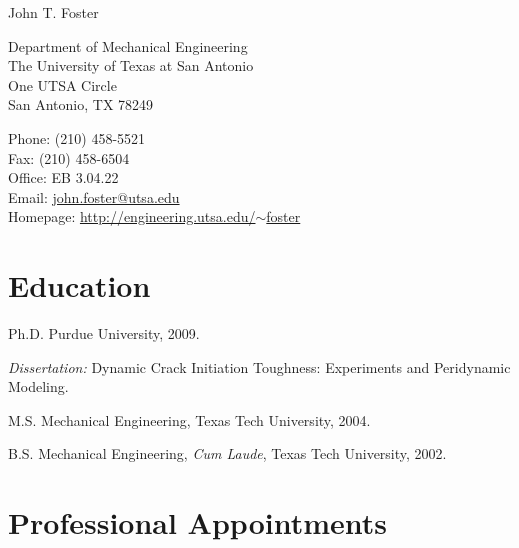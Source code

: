 \documentclass[12 pt,letterpaper]{article}
\makeatletter
\let\saved@bibitem\@bibitem %
\def\name{John T. Foster}
\renewenvironment{itemize}{
  \begin{list}{}{
    \setlength{\leftmargin}{1.5em}
    \setlength{\itemsep}{0.25em}
    \setlength{\parskip}{0pt}
    \setlength{\parsep}{0.25em}
  }
}{
  \end{list}
}
\makeatother
\begin{document}
\begingroup
\makeatletter
\let\@bibitem\saved@bibitem %
\endgroup


{\huge \name}


\bigskip

\begin{minipage}[t]{0.5\textwidth}
  Department of Mechanical Engineering \\
  The University of Texas at San Antonio \\
  One UTSA Circle \\
  San Antonio, TX 78249
\end{minipage}
\begin{minipage}[t]{0.5\textwidth}
  Phone: (210) 458-5521 \\
  Fax: (210) 458-6504 \\
  Office: EB 3.04.22 \\
  Email: \href{mailto:john.foster@utsa.edu}{john.foster@utsa.edu} \\
  Homepage: \href{http://engineering.utsa.edu/~foster}{http://engineering.utsa.edu/$\sim$foster}
\end{minipage}

\section*{Education}

\begin{itemize}
  \item Ph.D. Purdue University, 2009.
    \begin{itemize}
    \item \textit{Dissertation:}
      Dynamic Crack Initiation Toughness: Experiments and Peridynamic Modeling.
    \end{itemize}
  \item M.S. Mechanical Engineering, Texas Tech University, 2004.
  \item B.S. Mechanical Engineering, \textit{Cum Laude},
   Texas Tech University, 2002.
\end{itemize}

\section*{Professional Appointments}
\end{document}
